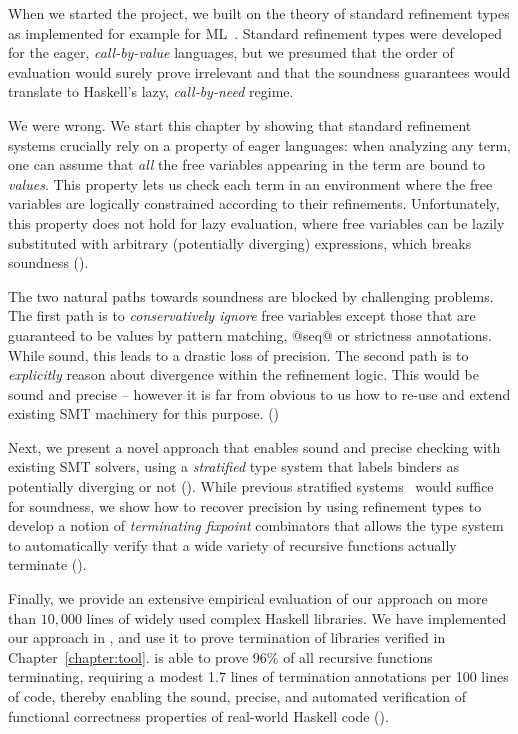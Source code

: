 When we started the \toolname project, 
we built on the theory of standard refinement types 
as implemented for example for ML~\cite{pfenningxi98,GordonRefinement09,LiquidPLDI08}.
%
Standard refinement types were developed for the eager, 
\emph{call-by-value} languages, but we presumed that
the order of evaluation would surely prove irrelevant
and that the soundness guarantees would translate 
to Haskell's lazy, \emph{call-by-need} regime.

We were wrong.
%
We start this chapter by showing that standard refinement 
systems crucially rely on a property of eager languages:
%
when analyzing any term, one can assume that \emph{all} the
free variables appearing in the term are bound to \emph{values}.
This property lets us check each term in an environment where 
the free variables are logically constrained according to 
their refinements.
%
Unfortunately, this property does not hold for lazy evaluation, 
where free variables can be lazily substituted with arbitrary 
(potentially diverging) expressions, which breaks 
soundness ().

The two natural paths towards soundness are blocked by challenging problems.
%
The first path is to \emph{conservatively ignore} free variables 
except those that are guaranteed to be values \eg by pattern 
matching, @seq@ or strictness annotations.  
While sound, this leads to a drastic loss of precision. 
%
The second path is to \emph{explicitly} reason about divergence 
within the refinement logic. This would be sound and 
precise -- however it is far from obvious to us how 
to re-use and extend existing SMT machinery for 
this purpose. ()


Next, we present a novel approach that
enables sound and precise checking with existing 
SMT solvers, using a \emph{stratified} type system that 
labels binders as potentially diverging or not 
().
%
While previous stratified systems~\cite{ConstableS87}
would suffice for soundness, we show how to recover 
precision by using refinement types to develop a 
notion of \emph{terminating fixpoint} combinators 
that allows the type system to automatically 
verify that a wide variety of recursive functions 
actually terminate ().

Finally, we provide an extensive empirical
evaluation of our approach on more than $10,000$ 
lines of widely used complex Haskell libraries.
We have implemented our approach in \toolname, 
and use it to prove termination of 
libraries verified in Chapter~\ref{chapter:tool}.
%
\toolname is able to prove 96\% of 
all recursive functions terminating, requiring a modest 
1.7 lines of termination annotations per 100 lines 
of code, thereby enabling the sound, precise, 
and automated verification of functional 
correctness properties of real-world Haskell code 
().